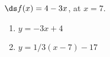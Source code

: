 {$\ds f(x) = 4-3x$, at $x=7$.
}
{\begin{enumerate}
\item		$y = -3x+4$
\item		$y = 1/3(x-7)-17$
\end{enumerate}
}
